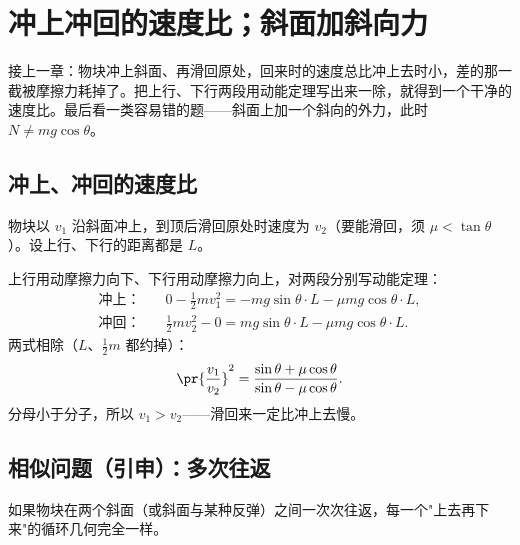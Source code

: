 \chapter{冲上冲回的速度比；斜面加斜向力}

接上一章：物块冲上斜面、再滑回原处，回来时的速度总比冲上去时小，差的那一截被摩擦力耗掉了。把上行、下行两段用动能定理写出来一除，就得到一个干净的速度比。最后看一类容易错的题——斜面上加一个斜向的外力，此时 $N\ne mg\cos\theta$。

\section{冲上、冲回的速度比}

物块以 $v_1$ 沿斜面冲上，到顶后滑回原处时速度为 $v_2$（要能滑回，须 $\mu<\tan\theta$）。设上行、下行的距离都是 $L$。

\begin{center}
\end{center}

上行用动摩擦力向下、下行用动摩擦力向上，对两段分别写动能定理：
\[
\begin{aligned}
\text{冲上：}\quad & 0-\tfrac12 m v_1^2=-mg\sin\theta\cdot L-\mu mg\cos\theta\cdot L,\\
\text{冲回：}\quad & \tfrac12 m v_2^2-0=mg\sin\theta\cdot L-\mu mg\cos\theta\cdot L.
\end{aligned}
\]
两式相除（$L$、$\tfrac12 m$ 都约掉）：
\[
\pr{\frac{v_1}{v_2}}^2=\frac{\sin\theta+\mu\cos\theta}{\sin\theta-\mu\cos\theta}.
\]
分母小于分子，所以 $v_1>v_2$——滑回来一定比冲上去慢。

\section{相似问题（引申）：多次往返}

如果物块在两个斜面（或斜面与某种反弹）之间一次次往返，每一个"上去再下来"的循环几何完全一样。

